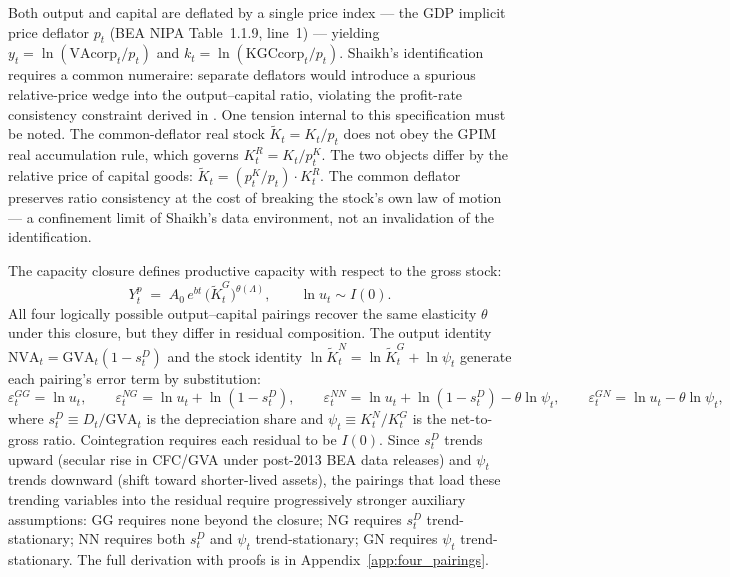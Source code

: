 \documentclass[11pt,a4paper]{article}
\begin{document}

Both output and capital are deflated by a single price index --- the GDP
implicit price deflator $p_t$ (BEA NIPA Table~1.1.9, line~1) --- yielding
$y_t = \ln(\text{VAcorp}_t / p_t)$ and
$k_t = \ln(\text{KGCcorp}_t / p_t)$. Shaikh's identification requires a
common numeraire: separate deflators would introduce a spurious
relative-price wedge into the output--capital ratio, violating the
profit-rate consistency constraint derived in \citet[Appendix~6.6]{Shaikh2016}.
One tension internal to this specification must be noted. The
common-deflator real stock $\tilde{K}_t = K_t / p_t$ does not obey the
GPIM real accumulation rule, which governs $K_t^R = K_t / p_t^K$. The two
objects differ by the relative price of capital goods:
$\tilde{K}_t = (p_t^K / p_t) \cdot K_t^R$. The common deflator preserves
ratio consistency at the cost of breaking the stock's own law of motion ---
a confinement limit of Shaikh's data environment, not an invalidation of
the identification.


The capacity closure defines productive capacity with respect to the gross
stock:
%
\begin{equation}
	\label{eq:capacity_closure}
	Y_t^p \;=\; A_0\, e^{bt}\,
	\bigl(\tilde{K}_t^{G}\bigr)^{\theta(\Lambda)},
	\qquad
	\ln u_t \sim I(0).
\end{equation}
%
All four logically possible output--capital pairings recover the same
elasticity $\theta$ under this closure, but they differ in residual
composition. The output identity $\text{NVA}_t = \text{GVA}_t(1 - s_t^D)$
and the stock identity
$\ln \tilde{K}_t^N = \ln \tilde{K}_t^G + \ln \psi_t$ generate each
pairing's error term by substitution:
%
\begin{equation}
	\label{eq:four_pairings_errors}
	\varepsilon_t^{GG} = \ln u_t, \qquad
	\varepsilon_t^{NG} = \ln u_t + \ln(1 - s_t^D), \qquad
	\varepsilon_t^{NN} = \ln u_t + \ln(1 - s_t^D) - \theta\ln\psi_t, \qquad
	\varepsilon_t^{GN} = \ln u_t - \theta\ln\psi_t,
\end{equation}
%
where $s_t^D \equiv D_t / \text{GVA}_t$ is the depreciation share and
$\psi_t \equiv K_t^N / K_t^G$ is the net-to-gross ratio. Cointegration
requires each residual to be $I(0)$. Since $s_t^D$ trends upward (secular
rise in CFC/GVA under post-2013 BEA data releases) and $\psi_t$ trends
downward (shift toward shorter-lived assets), the pairings that load these
trending variables into the residual require progressively stronger
auxiliary assumptions: GG requires none beyond the closure; NG requires
$s_t^D$ trend-stationary; NN requires both $s_t^D$ and $\psi_t$
trend-stationary; GN requires $\psi_t$ trend-stationary. The full
derivation with proofs is in Appendix~\ref{app:four_pairings}.
\end{document}
